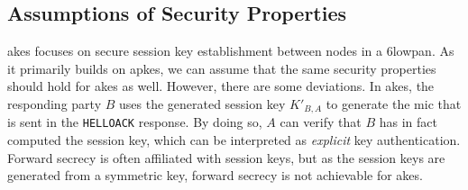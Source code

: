 



\subsection{Assumptions of Security Properties}
\label{subsec:akes-props}

\gls{akes} focuses on secure session key establishment between nodes in a \gls{6lowpan}. As it primarily builds on \gls{apkes}, we can assume that the same security properties should hold for \gls{akes} as well. However, there are some deviations. In \gls{akes}, the responding party $B$ uses the generated session key $K'_{B,A}$ to generate the \gls{mic} that is sent in the \texttt{HELLOACK} response. By doing so, $A$ can verify that $B$ has in fact computed the session key, which can be interpreted as \emph{explicit} key authentication. Forward secrecy is often affiliated with session keys, but as the session keys are generated from a symmetric key, forward secrecy is not achievable for \gls{akes}. 



